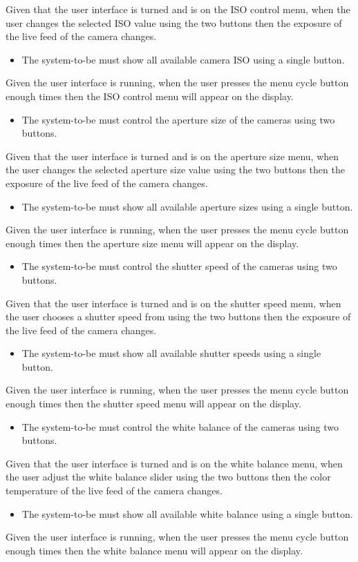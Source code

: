 Given that the user interface is turned and is on the ISO control menu, when the user changes the selected ISO value using the two buttons then the exposure of the live feed of the camera changes.
\begin{itemize}
	\item The system-to-be must show all available camera ISO using a single button.
\end{itemize}
Given the user interface is running, when the user presses the menu cycle button enough times then the ISO control menu will appear on the display.
\begin{itemize}
	\item The system-to-be must control the aperture size of the cameras using two buttons.
\end{itemize}
Given that the user interface is turned and is on the aperture size menu, when the user changes the selected aperture size value using the two buttons then the exposure of the live feed of the camera changes.
\begin{itemize}
	\item The system-to-be must show all available aperture sizes using a single button.
\end{itemize}
Given the user interface is running, when the user presses the menu cycle button enough times then the aperture size menu will appear on the display.
\begin{itemize}
	\item The system-to-be must control the shutter speed of the cameras using two buttons.
\end{itemize}
Given that the user interface is turned and is on the shutter speed menu, when the user chooses a shutter speed from using the two buttons then the exposure of the live feed of the camera changes.
\begin{itemize}
	\item The system-to-be must show all available shutter speeds using a single button.
\end{itemize}
Given the user interface is running, when the user presses the menu cycle button enough times then the shutter speed menu will appear on the display.
\begin{itemize}
	\item The system-to-be must control the white balance of the cameras using two buttons.
\end{itemize}
Given that the user interface is turned and is on the white balance menu, when the user adjust the white balance slider using the two buttons then the color temperature of the live feed of the camera changes.
\begin{itemize}
	\item The system-to-be must show all available white balance using a single button.
\end{itemize}
Given the user interface is running, when the user presses the menu cycle button enough times then the white balance menu will appear on the display.
